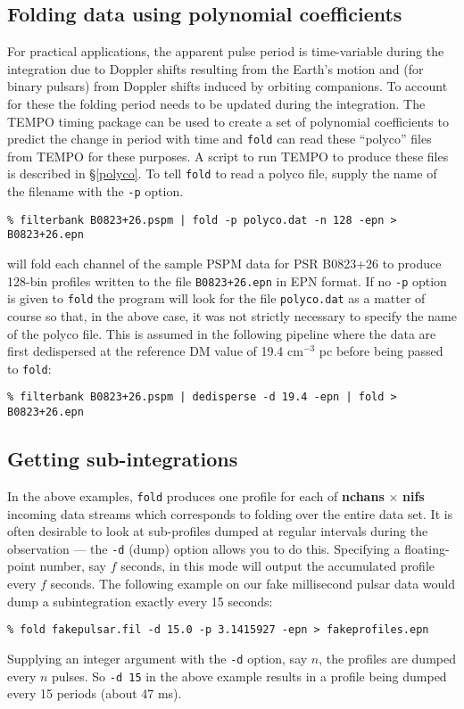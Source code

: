 \documentclass[11pt]{article}
\begin{document}
\subsection*{Folding data using polynomial coefficients} For practical
applications, the apparent pulse period is time-variable during
the integration due to Doppler shifts resulting from the Earth's
motion and (for binary pulsars) from Doppler shifts induced by
orbiting companions. To account for these the folding period 
needs to be updated during the integration. The {\sc TEMPO}
timing package can be used to create a set of polynomial coefficients
to predict the change in period with time and {\tt fold} can
read these ``polyco'' files from {\sc TEMPO} for these
purposes. A script to run {\sc TEMPO} to produce these files
is described in \S \ref{polyco}.
To tell {\tt fold} to read a polyco file, supply
the name of the filename with the {\tt -p} option.
\begin{verbatim}
% filterbank B0823+26.pspm | fold -p polyco.dat -n 128 -epn > B0823+26.epn
\end{verbatim}
will fold each channel of the sample PSPM data for PSR B0823+26 to
produce 128-bin profiles written to the file {\tt B0823+26.epn} in
EPN format. If no {\tt -p} option is given to {\tt fold} the program
will look for the file {\tt polyco.dat} as a matter of course so
that, in the above case, it was not strictly necessary to specify
the name of the polyco file. This is assumed in the following pipeline
where the data are first dedispersed at the reference DM value of
19.4 cm$^{-3}$ pc before being passed to {\tt fold}:
\begin{verbatim}
% filterbank B0823+26.pspm | dedisperse -d 19.4 -epn | fold > B0823+26.epn
\end{verbatim}

\subsection*{Getting sub-integrations} In the above examples,
{\tt fold} produces one profile for each of {\bf nchans} $\times$ {\bf nifs}
incoming data streams which corresponds to folding over the entire data 
set. It is often desirable to look at sub-profiles dumped at regular
intervals during the observation --- the {\tt -d} (dump) option allows you 
to do this. Specifying a floating-point number, say $f$ seconds, in this 
mode will output the accumulated profile every $f$ seconds.
The following example on
our fake millisecond pulsar data would dump a subintegration exactly
every 15 seconds:
\begin{verbatim}
% fold fakepulsar.fil -d 15.0 -p 3.1415927 -epn > fakeprofiles.epn
\end{verbatim}
Supplying an integer argument with the {\tt -d} option, 
say $n$, the profiles are dumped every $n$ pulses. So {\tt -d 15}
in the above example
results in a profile being dumped every 15 periods (about 47 ms).
\end{document}
